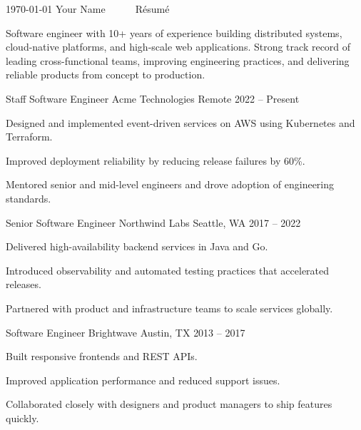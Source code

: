 \documentclass[11pt, a4paper]{awesome-cv}
\begin{document}
\makecvheader[C]

\makecvfooter
  {\today}
  {Your Name~~~\textperiodcentered~~~R\'esum\'e}
  {\thepage}

\begin{cvparagraph}
Software engineer with 10+ years of experience building distributed systems, cloud-native platforms, and high-scale web applications. Strong track record of leading cross-functional teams, improving engineering practices, and delivering reliable products from concept to production.
\end{cvparagraph}

\begin{cventries}

\cventry
  {Staff Software Engineer}
  {Acme Technologies}
  {Remote}
  {2022 -- Present}
  {
    \begin{cvitems}
      \item {Designed and implemented event-driven services on AWS using Kubernetes and Terraform.}
      \item {Improved deployment reliability by reducing release failures by 60\%.}
      \item {Mentored senior and mid-level engineers and drove adoption of engineering standards.}
    \end{cvitems}
  }

\cventry
  {Senior Software Engineer}
  {Northwind Labs}
  {Seattle, WA}
  {2017 -- 2022}
  {
    \begin{cvitems}
      \item {Delivered high-availability backend services in Java and Go.}
      \item {Introduced observability and automated testing practices that accelerated releases.}
      \item {Partnered with product and infrastructure teams to scale services globally.}
    \end{cvitems}
  }

\cventry
  {Software Engineer}
  {Brightwave}
  {Austin, TX}
  {2013 -- 2017}
  {
    \begin{cvitems}
      \item {Built responsive frontends and REST APIs.}
      \item {Improved application performance and reduced support issues.}
      \item {Collaborated closely with designers and product managers to ship features quickly.}
    \end{cvitems}
  }

\end{cventries}
\end{document}
